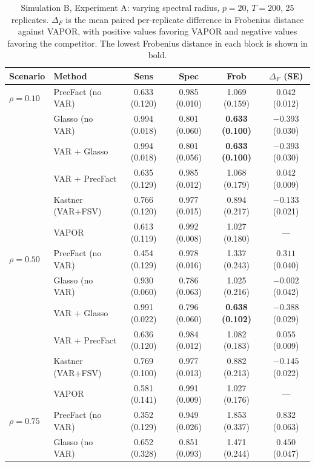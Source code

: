 \begin{table}[h!]
\centering
\small
\setlength{\tabcolsep}{4pt}
\caption{Simulation B, Experiment A: varying spectral radius, $p=20$, $T=200$, 25 replicates. $\Delta_F$ is the mean paired per-replicate difference in Frobenius distance against VAPOR, with positive values favoring VAPOR and negative values favoring the competitor. The lowest Frobenius distance in each block is shown in bold.}
\label{tab:sim-b-autocorr}
\begin{tabular}{llcccc}
\toprule
Scenario & Method & Sens & Spec & Frob & $\Delta_F$ (SE) \\
\midrule
$\rho = 0.10$ & PrecFact (no VAR)  & 0.633 (0.120) & 0.985 (0.010) & 1.069 (0.159) & $0.042$ (0.012) \\
              & Glasso (no VAR)    & 0.994 (0.018) & 0.801 (0.060) & \textbf{0.633 (0.100)} & $-0.393$ (0.030) \\
              & VAR + Glasso       & 0.994 (0.018) & 0.801 (0.056) & \textbf{0.633 (0.100)} & $-0.393$ (0.030) \\
              & VAR + PrecFact     & 0.635 (0.129) & 0.985 (0.012) & 1.068 (0.179) & $0.042$ (0.009) \\
              & Kastner (VAR+FSV)  & 0.766 (0.120) & 0.977 (0.015) & 0.894 (0.217) & $-0.133$ (0.021) \\
              & VAPOR              & 0.613 (0.119) & 0.992 (0.008) & 1.027 (0.180) & --- \\
\midrule
$\rho = 0.50$ & PrecFact (no VAR)  & 0.454 (0.129) & 0.978 (0.016) & 1.337 (0.243) & $0.311$ (0.040) \\
              & Glasso (no VAR)    & 0.930 (0.060) & 0.786 (0.063) & 1.025 (0.216) & $-0.002$ (0.042) \\
              & VAR + Glasso       & 0.991 (0.022) & 0.796 (0.060) & \textbf{0.638 (0.102)} & $-0.388$ (0.029) \\
              & VAR + PrecFact     & 0.636 (0.120) & 0.984 (0.012) & 1.082 (0.183) & $0.055$ (0.009) \\
              & Kastner (VAR+FSV)  & 0.769 (0.100) & 0.977 (0.013) & 0.882 (0.213) & $-0.145$ (0.022) \\
              & VAPOR              & 0.581 (0.141) & 0.991 (0.009) & 1.027 (0.176) & --- \\
\midrule
$\rho = 0.75$ & PrecFact (no VAR)  & 0.352 (0.129) & 0.949 (0.026) & 1.853 (0.337) & $0.832$ (0.063) \\
              & Glasso (no VAR)    & 0.652 (0.328) & 0.851 (0.093) & 1.471 (0.244) & $0.450$ (0.047) \\

\end{tabular}
\end{table}
